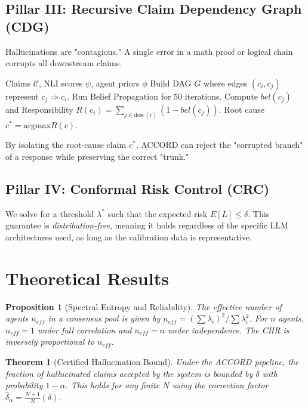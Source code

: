 \documentclass[conference]{IEEEtran}
\newtheorem{theorem}{Theorem}
\newtheorem{proposition}{Proposition}
\begin{document}
\subsection{Pillar III: Recursive Claim Dependency Graph (CDG)}
Hallucinations are "contagious." A single error in a math proof or logical chain corrupts all downstream claims. 
\begin{algorithm}
\caption{Recursive Patient Zero Attribution}
\label{alg:bp}
\begin{algorithmic}[1]
\REQUIRE Claims $\mathcal{C}$, NLI scores $\psi$, agent priors $\phi$
\STATE Build DAG $G$ where edges $(c_i, c_j)$ represent $c_j \Rightarrow c_i$.
\STATE Run Belief Propagation for 50 iterations.
\STATE Compute $bel(c_j)$ and Responsibility $R(c_i) = \sum_{j \in \text{desc}(i)} (1 - bel(c_j))$.
\RETURN Root cause $c^* = \text{argmax} R(c)$.
\end{algorithmic}
\end{algorithm}
By isolating the root-cause claim $c^*$, ACCORD can reject the "corrupted branch" of a response while preserving the correct "trunk."

\subsection{Pillar IV: Conformal Risk Control (CRC)}
We solve for a threshold $\lambda^*$ such that the expected risk $E[L] \leq \delta$. This guarantee is \textit{distribution-free}, meaning it holds regardless of the specific LLM architectures used, as long as the calibration data is representative.

\section{Theoretical Results}

\begin{proposition}[Spectral Entropy and Reliability]
The effective number of agents $n_{eff}$ in a consensus pool is given by $n_{eff} = (\sum \lambda_i)^2 / \sum \lambda_i^2$. For $n$ agents, $n_{eff} = 1$ under full correlation and $n_{eff} = n$ under independence. The CHR is inversely proportional to $n_{eff}$.
\end{proposition}

\begin{theorem}[Certified Hallucination Bound]
Under the ACCORD pipeline, the fraction of hallucinated claims accepted by the system is bounded by $\delta$ with probability $1 - \alpha$. This holds for any finite $N$ using the correction factor $\hat{\delta}_\alpha = \frac{N+1}{N}(\delta)$.
\end{theorem}
\end{document}
